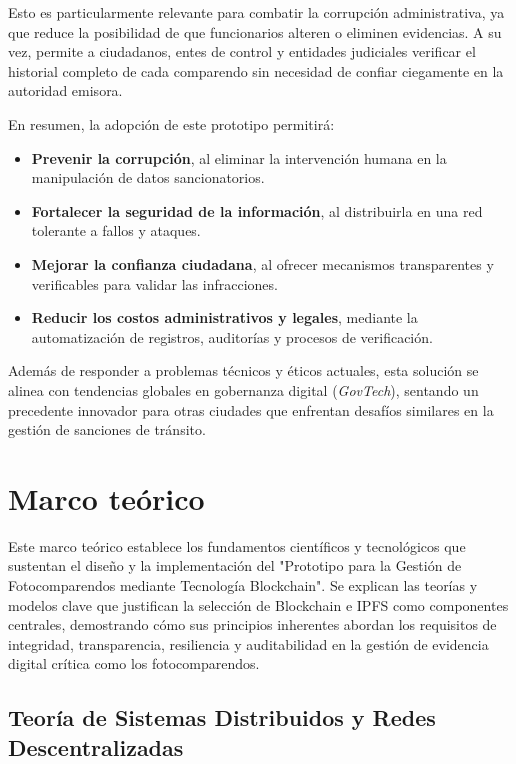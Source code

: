 \documentclass[
    letterpaper, 
    man,   
    spanish,
    12pt,
    donotrepeattitle,
    floatsintext,
    hidelinks %
]{apa7}
\renewcommand{\large}{\fontsize{14.4}{18}\selectfont}
\begin{document}
Esto es particularmente relevante para combatir la corrupción administrativa, ya que reduce la posibilidad de que funcionarios alteren o eliminen evidencias. A su vez, permite a ciudadanos, entes de control y entidades judiciales verificar el historial completo de cada comparendo sin necesidad de confiar ciegamente en la autoridad emisora.

En resumen, la adopción de este prototipo permitirá:

\begin{itemize}
    \item \textbf{Prevenir la corrupción}, al eliminar la intervención humana en la manipulación de datos sancionatorios.
    \item \textbf{Fortalecer la seguridad de la información}, al distribuirla en una red tolerante a fallos y ataques.
    \item \textbf{Mejorar la confianza ciudadana}, al ofrecer mecanismos transparentes y verificables para validar las infracciones.
    \item \textbf{Reducir los costos administrativos y legales}, mediante la automatización de registros, auditorías y procesos de verificación.
\end{itemize}

Además de responder a problemas técnicos y éticos actuales, esta solución se alinea con tendencias globales en gobernanza digital (\textit{GovTech}), sentando un precedente innovador para otras ciudades que enfrentan desafíos similares en la gestión de sanciones de tránsito.

\newpage
\section{\large Marco teórico}
Este marco teórico establece los fundamentos científicos y tecnológicos que sustentan el diseño y la implementación del "Prototipo para la Gestión de Fotocomparendos mediante Tecnología Blockchain". Se explican las teorías y modelos clave que justifican la selección de Blockchain e IPFS como componentes centrales, demostrando cómo sus principios inherentes abordan los requisitos de integridad, transparencia, resiliencia y auditabilidad en la gestión de evidencia digital crítica como los fotocomparendos. 

\subsection{Teoría de Sistemas Distribuidos y Redes Descentralizadas} 
\end{document}
